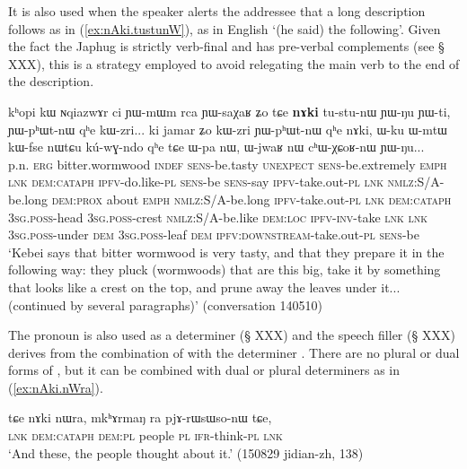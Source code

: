 It is also used  when the speaker alerts the addressee that a long description follows as in (\ref{ex:nAki.tustunW}), as in English `(he said) the following'. Given the fact the Japhug is strictly verb-final and has pre-verbal complements (see § XXX), this is a strategy employed to avoid relegating the main verb to the end of the description.

 \begin{exe}
\ex \label{ex:nAki.tustunW}
 \gll
kʰopi kɯ ɴqiazwɤr ci ɲɯ-mɯm rca ɲɯ-saχaʁ ʑo tɕe \textbf{nɤki} tu-stu-nɯ ɲɯ-ŋu ɲɯ-ti, ɲɯ-pʰɯt-nɯ qʰe kɯ-zri... ki jamar ʑo kɯ-zri ɲɯ-pʰɯt-nɯ qʰe nɤki, ɯ-ku ɯ-mtɯ kɯ-fse nɯtɕu kú-wɣ-ndo qʰe tɕe ɯ-pa nɯ, ɯ-jwaʁ nɯ cʰɯ-χɕoʁ-nɯ ɲɯ-ŋu...  \\
p.n. \textsc{erg} bitter.wormwood \textsc{indef} \textsc{sens}-be.tasty \textsc{unexpect} \textsc{sens}-be.extremely \textsc{emph} \textsc{lnk} \textsc{dem:cataph} \textsc{ipfv}-do.like-\textsc{pl} \textsc{sens}-be \textsc{sens}-say \textsc{ipfv}-take.out-\textsc{pl} \textsc{lnk} \textsc{nmlz}:S/A-be.long \textsc{dem:prox} about \textsc{emph} \textsc{nmlz}:S/A-be.long \textsc{ipfv}-take.out-\textsc{pl} \textsc{lnk} \textsc{dem:cataph} \textsc{3sg.poss}-head  \textsc{3sg.poss}-crest \textsc{nmlz}:S/A-be.like  \textsc{dem:loc} \textsc{ipfv-inv}-take \textsc{lnk} \textsc{lnk} \textsc{3sg.poss}-under \textsc{dem}  \textsc{3sg.poss}-leaf \textsc{dem} \textsc{ipfv:downstream}-take.out-\textsc{pl}  \textsc{sens}-be \\
\glt `Kebei says that bitter wormwood is very tasty, and that they prepare it in the following way: they pluck (wormwoods) that are this big, take it by something that looks like a crest on the top, and prune away the leaves under it... (continued by several paragraphs)' (conversation 140510)
\end{exe}

The pronoun  is also used as a determiner (§ XXX) and the speech filler  (§ XXX) derives from the combination of    with the determiner . There are no plural or dual forms of , but it can be combined with dual or plural determiners as in (\ref{ex:nAki.nWra}).

\begin{exe}
\ex \label{ex:nAki.nWra}
\gll  tɕe nɤki nɯra, mkʰɤrmaŋ ra pjɤ-rɯsɯso-nɯ tɕe, \\
\textsc{lnk} \textsc{dem:cataph} \textsc{dem}:\textsc{pl} people \textsc{pl} \textsc{ifr}-think-\textsc{pl} \textsc{lnk} \\
\glt `And these, the people thought about it.' (150829 jidian-zh, 138)
\end{exe}

